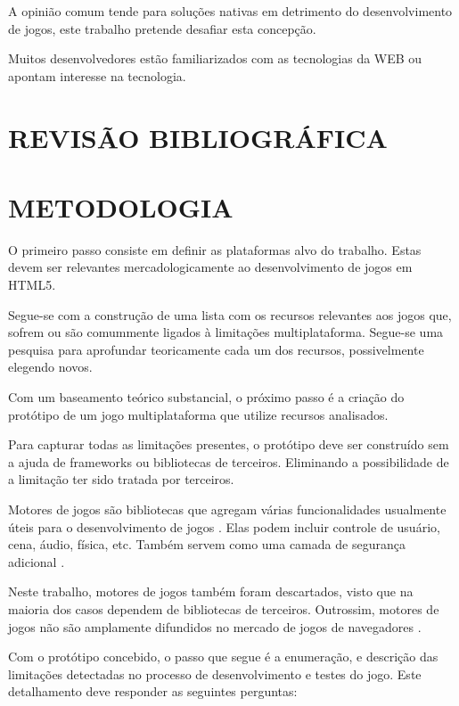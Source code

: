 \documentclass[
12pt,
a4paper,
portuges,
draft
]{report}
\begin{document}
A opinião comum tende para soluções nativas em detrimento do
desenvolvimento de jogos, este trabalho pretende desafiar esta
concepção.

Muitos desenvolvedores estão familiarizados
com as tecnologias da WEB ou apontam interesse na tecnologia.


\chapter{REVISÃO BIBLIOGRÁFICA}

\chapter{METODOLOGIA}
\thispagestyle{myheadings}

O primeiro passo consiste em definir as plataformas alvo do trabalho.
Estas devem ser relevantes mercadologicamente ao desenvolvimento de jogos em HTML5.

Segue-se com a construção de uma lista com os recursos relevantes
aos jogos que, sofrem ou são comummente ligados à
limitações multiplataforma. Segue-se uma pesquisa para aprofundar
teoricamente cada um dos recursos, possivelmente elegendo novos.

Com um baseamento teórico substancial, o próximo passo é a criação
do protótipo de um jogo multiplataforma que utilize recursos
analisados.

Para capturar todas as limitações presentes, o protótipo deve ser
construído sem a ajuda de frameworks ou bibliotecas de terceiros.
Eliminando a possibilidade de a limitação ter sido tratada por
terceiros.

Motores de jogos são bibliotecas que agregam várias funcionalidades
usualmente úteis para o desenvolvimento de jogos \autocite[pp.
5]{browserGamesTechnologyAndFuture}. Elas podem incluir controle
de usuário, cena, áudio, física, etc. Também servem como uma camada de 
segurança adicional \autocite{browserGamesTechnologyAndFuture}.

Neste trabalho, motores de jogos também foram descartados, visto que
na maioria dos casos dependem de bibliotecas de terceiros. Outrossim,
motores de jogos não são amplamente difundidos no mercado de jogos de
navegadores \autocite{browserGamesTechnologyAndFuture}.

Com o protótipo concebido, o passo que segue é a enumeração, e
descrição das limitações detectadas no processo de desenvolvimento e
testes do jogo. Este detalhamento deve responder as seguintes perguntas:
\end{document}
